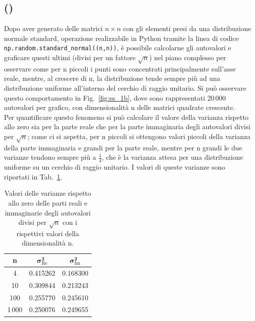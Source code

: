 \documentclass[a4paper]{article}
\newcounter{count_es}
\newcounter{count_sub_es}[count_es]
\renewcommand{\figurename}{Fig.}
\renewcommand{\tablename}{Tab.}
\begin{document}
\subsection*{ ()}
Dopo aver generato delle matrici \(n \times n\) con gli elementi
presi da una distribuzione normale standard, operazione realizzabile
in Python tramite la linea di codice \lstinline{np.random.standard_normal((n,n))}, 
è possibile calcolarne gli autovalori e graficare questi ultimi (divisi per un fattore \(\sqrt{n}\))
nel piano complesso per osservare come per n piccoli i punti sono concentrati
principalmente sull'asse reale, mentre, al crescere di n, la distribuzione 
tende sempre più ad una distribuzione uniforme
all'interno del cerchio di raggio unitario. 
Si può osservare questo comportamento in \figurename~\ref{fig:es_1b}, dove sono
rappresentati 20\,000 autovalori per grafico, con dimensionalità n delle matrici quadrate crescente.\\
Per quantificare questo fenomeno si può calcolare il valore della varianza rispetto allo zero sia 
per la parte reale che per la parte immaginaria degli autovalori divisi per \(\sqrt{n}\); come ci si aspetta,
per n piccoli si ottengono valori piccoli della varianza della parte immaginaria e grandi per la parte
reale, mentre per n grandi le due varianze tendono sempre più a \(\frac{1}{4}\), che è la varianza attesa
per una distribuzione uniforme su un cerchio di raggio unitario. I valori di queste varianze sono riportati in
\tablename~\ref{tab:es_1b}.
\begin{table}[H]
    \centering
    \setlength{\tabcolsep}{10pt}  %
    \renewcommand{\arraystretch}{1.25} %
    \begin{tabular}{c | c | c}
        \textbf{n} & \(\bm{\sigma^{2}_{\mathrm{Re}}}\) & \(\bm{\mathbf{\sigma}^{2}_{\mathrm{Im}}}\) \\
        \hline
        4 & 0.415262 & 0.168300 \\
        10 & 0.309844 & 0.213243\\
        100 & 0.255770 & 0.245610\\
        1\,000 & 0.250076 & 0.249655\\
    \end{tabular}
    \caption{Valori delle varianze rispetto allo zero delle parti reali e immaginarie degli autovalori divisi per 
    \(\sqrt{n}\) con i rispettivi valori della dimensionalità n.
    \label{tab:es_1b}}
\end{table}
\end{document}
